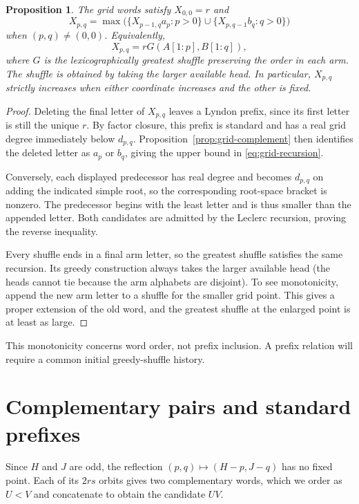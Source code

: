 \documentclass[11pt]{amsart}
\numberwithin{equation}{section}
\newtheorem{proposition}[theorem]{Proposition}
\theoremstyle{definition}
\begin{document}
\begin{proposition}\label{prop:grid-shuffle}
The grid words satisfy $X_{0,0}=r$ and
\begin{equation}\label{eq:grid-recursion}
 X_{p,q}=\max\bigl(
 \{X_{p-1,q}a_p:p>0\}\cup
 \{X_{p,q-1}b_q:q>0\}\bigr)
\end{equation}
when $(p,q)\ne(0,0)$. Equivalently,
\[
 X_{p,q}=rG(A[1:p],B[1:q]),
\]
where $G$ is the lexicographically greatest shuffle preserving the order in each arm. The shuffle is obtained by taking the larger available head. In particular, $X_{p,q}$ strictly increases when either coordinate increases and the other is fixed.
\end{proposition}
\begin{proof}
Deleting the final letter of $X_{p,q}$ leaves a Lyndon prefix, since its first letter is still the unique $r$. By factor closure, this prefix is standard and has a real grid degree immediately below $d_{p,q}$. Proposition~\ref{prop:grid-complement} then identifies the deleted letter as $a_p$ or $b_q$, giving the upper bound in \eqref{eq:grid-recursion}.

Conversely, each displayed predecessor has real degree and becomes $d_{p,q}$ on adding the indicated simple root, so the corresponding root-space bracket is nonzero. The predecessor begins with the least letter and is thus smaller than the appended letter. Both candidates are admitted by the Leclerc recursion, proving the reverse inequality.

Every shuffle ends in a final arm letter, so the greatest shuffle satisfies the same recursion. Its greedy construction always takes the larger available head (the heads cannot tie because the arm alphabets are disjoint). To see monotonicity, append the new arm letter to a shuffle for the smaller grid point. This gives a proper extension of the old word, and the greatest shuffle at the enlarged point is at least as large.
\end{proof}

This monotonicity concerns word order, not prefix inclusion. A prefix relation will require a common initial greedy-shuffle history.

\section{Complementary pairs and standard prefixes}\label{sec:pairs}

Since $H$ and $J$ are odd, the reflection $(p,q)\mapsto(H-p,J-q)$ has no fixed point. Each of its $2rs$ orbits gives two complementary words, which we order as $U<V$ and concatenate to obtain the candidate $UV$.
\end{document}
